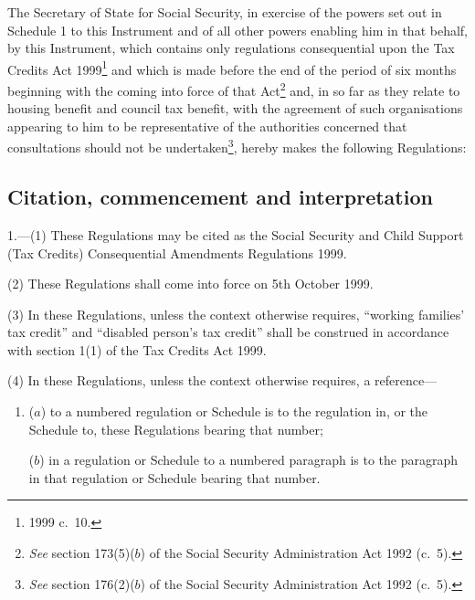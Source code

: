 \documentclass[12pt,a4paper]{article}
\title{\regstitle}
\author{S.I.\ 1999 No.\ 2566}
\date{Made
13th September 1999\\
Laid before Parliament
14th September 1999\\
Coming into force
5th October 1999
}
\begin{document}
\maketitle

\noindent
The Secretary of State for Social Security, in exercise of the powers set out in Schedule 1 to this Instrument and of all other powers enabling him in that behalf, by this Instrument, which contains only regulations consequential upon the Tax Credits Act 1999\footnote{1999 c.\ 10.} and which is made before the end of the period of six months beginning with the coming into force of that Act\footnote{\emph{See} section 173(5)($b$)  of the Social Security Administration Act 1992 (c.\ 5).} and, in so far as they relate to housing benefit and council tax benefit, with the agreement of such organisations appearing to him to be representative of the authorities concerned that consultations should not be undertaken\footnote{\emph{See} section 176(2)($b$) of the Social Security Administration Act 1992 (c.\ 5).}, hereby makes the following Regulations: 

{\sloppy

\tableofcontents

}

\bigskip

\setcounter{secnumdepth}{-2}

\subsection[1. Citation, commencement and interpretation]{Citation, commencement and interpretation}

1.---(1)  These Regulations may be cited as the Social Security and Child Support (Tax Credits) Consequential Amendments Regulations 1999.

(2) These Regulations shall come into force on 5th October 1999.

(3) In these Regulations, unless the context otherwise requires, “working families' tax credit” and “disabled person’s tax credit” shall be construed in accordance with section 1(1) of the Tax Credits Act 1999.

(4) In these Regulations, unless the context otherwise requires, a reference—
\begin{enumerate}\item[]
($a$) to a numbered regulation or Schedule is to the regulation in, or the Schedule to, these Regulations bearing that number;

($b$) in a regulation or Schedule to a numbered paragraph is to the paragraph in that regulation or Schedule bearing that number.
\end{enumerate}
\end{document}
